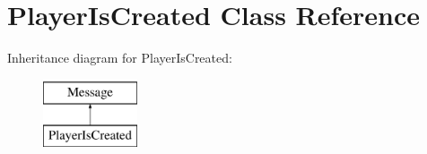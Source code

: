 \hypertarget{class_player_is_created}{\section{Player\-Is\-Created Class Reference}
\label{class_player_is_created}
}
Inheritance diagram for Player\-Is\-Created\-:\begin{figure}[H]
\begin{center}
\leavevmode
\includegraphics[height=2.000000cm]{class_player_is_created}
\end{center}
\end{figure}
